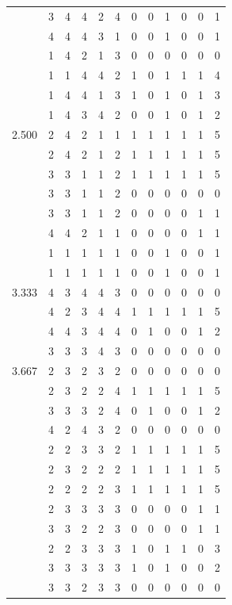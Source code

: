 \documentclass[]{book}
\theoremstyle{definition}
\theoremstyle{definition}
\theoremstyle{definition}
\theoremstyle{remark}
\begin{document}
\begin{table}
{\begin{tabular}[t]{rrrrrrrrrrrr}
 & 3 & 4 & 4 & 2 & 4 & 0 & 0 & 1 & 0 & 0 & 1\\
 & 4 & 4 & 4 & 3 & 1 & 0 & 0 & 1 & 0 & 0 & 1\\
 & 1 & 4 & 2 & 1 & 3 & 0 & 0 & 0 & 0 & 0 & 0\\
 & 1 & 1 & 4 & 4 & 2 & 1 & 0 & 1 & 1 & 1 & 4\\
 & 1 & 4 & 4 & 1 & 3 & 1 & 0 & 1 & 0 & 1 & 3\\
 & 1 & 4 & 3 & 4 & 2 & 0 & 0 & 1 & 0 & 1 & 2\\
2.500 & 2 & 4 & 2 & 1 & 1 & 1 & 1 & 1 & 1 & 1 & 5\\
 & 2 & 4 & 2 & 1 & 2 & 1 & 1 & 1 & 1 & 1 & 5\\
 & 3 & 3 & 1 & 1 & 2 & 1 & 1 & 1 & 1 & 1 & 5\\
 & 3 & 3 & 1 & 1 & 2 & 0 & 0 & 0 & 0 & 0 & 0\\
 & 3 & 3 & 1 & 1 & 2 & 0 & 0 & 0 & 0 & 1 & 1\\
 & 4 & 4 & 2 & 1 & 1 & 0 & 0 & 0 & 0 & 1 & 1\\
 & 1 & 1 & 1 & 1 & 1 & 0 & 0 & 1 & 0 & 0 & 1\\
 & 1 & 1 & 1 & 1 & 1 & 0 & 0 & 1 & 0 & 0 & 1\\
3.333 & 4 & 3 & 4 & 4 & 3 & 0 & 0 & 0 & 0 & 0 & 0\\
 & 4 & 2 & 3 & 4 & 4 & 1 & 1 & 1 & 1 & 1 & 5\\
 & 4 & 4 & 3 & 4 & 4 & 0 & 1 & 0 & 0 & 1 & 2\\
 & 3 & 3 & 3 & 4 & 3 & 0 & 0 & 0 & 0 & 0 & 0\\
3.667 & 2 & 3 & 2 & 3 & 2 & 0 & 0 & 0 & 0 & 0 & 0\\
 & 2 & 3 & 2 & 2 & 4 & 1 & 1 & 1 & 1 & 1 & 5\\
 & 3 & 3 & 3 & 2 & 4 & 0 & 1 & 0 & 0 & 1 & 2\\
 & 4 & 2 & 4 & 3 & 2 & 0 & 0 & 0 & 0 & 0 & 0\\
 & 2 & 2 & 3 & 3 & 2 & 1 & 1 & 1 & 1 & 1 & 5\\
 & 2 & 3 & 2 & 2 & 2 & 1 & 1 & 1 & 1 & 1 & 5\\
 & 2 & 2 & 2 & 2 & 3 & 1 & 1 & 1 & 1 & 1 & 5\\
 & 2 & 3 & 3 & 3 & 3 & 0 & 0 & 0 & 0 & 1 & 1\\
 & 3 & 3 & 2 & 2 & 3 & 0 & 0 & 0 & 0 & 1 & 1\\
 & 2 & 2 & 3 & 3 & 3 & 1 & 0 & 1 & 1 & 0 & 3\\
 & 3 & 3 & 3 & 3 & 3 & 1 & 0 & 1 & 0 & 0 & 2\\
 & 3 & 3 & 2 & 3 & 3 & 0 & 0 & 0 & 0 & 0 & 0\\

\end{tabular}}
\end{table}
\end{document}
